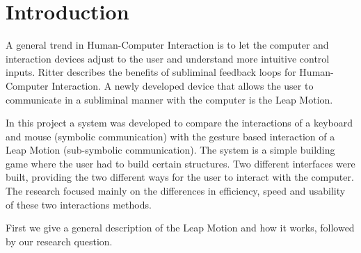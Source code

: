 \section{Introduction}



A general trend in Human-Computer Interaction is to let the computer and interaction devices adjust to the user and understand more intuitive control inputs. 
Ritter \cite{ritter2011benefits} describes the benefits of subliminal feedback loops for Human-Computer Interaction. 
A newly developed device that allows the user to communicate in a subliminal manner with the computer is the Leap Motion. 

In this project a system was developed to compare the interactions of a keyboard and mouse (symbolic communication) with the gesture based interaction of a Leap Motion (sub-symbolic communication). 
The system is a simple building game where the user had to build certain structures. Two different interfaces were built, providing the two different ways for the user to interact with the computer.
The research focused mainly on the differences in efficiency, speed and usability of these two interactions methods.

First we give a general description of the Leap Motion and how it works, followed by our research question.


